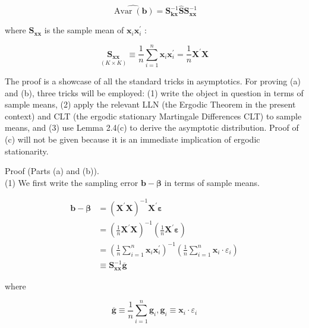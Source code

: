 \documentclass[10pt]{article}
\begin{document}
\begin{equation*}
\widehat{\operatorname{Avar}(\mathbf{b})}=\mathbf{S}_{\mathbf{k x}}^{-1} \widehat{\mathbf{S}} \mathbf{S}_{\mathbf{x x}}^{-1} \tag{2.3.5}
\end{equation*}


where $\mathbf{S}_{\mathbf{x x}}$ is the sample mean of $\mathbf{x}_{i} \mathbf{x}_{i}^{\prime}$ :


\begin{equation*}
\underset{(K \times K)}{\mathbf{S}_{\mathbf{x x}}} \equiv \frac{1}{n} \sum_{i=1}^{n} \mathbf{x}_{i} \mathbf{x}_{i}^{\prime}=\frac{1}{n} \mathbf{X}^{\prime} \mathbf{X} \tag{2.3.6}
\end{equation*}


The proof is a showcase of all the standard tricks in asymptotics. For proving (a) and (b), three tricks will be employed: (1) write the object in question in terms of sample means, (2) apply the relevant LLN (the Ergodic Theorem in the present context) and CLT (the ergodic stationary Martingale Differences CLT) to sample means, and (3) use Lemma 2.4(c) to derive the asymptotic distribution. Proof of (c) will not be given because it is an immediate implication of ergodic stationarity.

Proof (Parts (a) and (b)).\\
(1) We first write the sampling error $\mathbf{b}-\boldsymbol{\beta}$ in terms of sample means.


\begin{align*}
\mathbf{b}-\boldsymbol{\beta} & =\left(\mathbf{X}^{\prime} \mathbf{X}\right)^{-1} \mathbf{X}^{\prime} \boldsymbol{\varepsilon} \\
& =\left(\frac{1}{n} \mathbf{X}^{\prime} \mathbf{X}\right)^{-1}\left(\frac{1}{n} \mathbf{X}^{\prime} \boldsymbol{\varepsilon}\right) \\
& =\left(\frac{1}{n} \sum_{i=1}^{n} \mathbf{x}_{i} \mathbf{x}_{i}^{\prime}\right)^{-1}\left(\frac{1}{n} \sum_{i=1}^{n} \mathbf{x}_{i} \cdot \varepsilon_{i}\right) \\
& \equiv \mathbf{S}_{\mathbf{x x}}^{-1} \overline{\mathbf{g}} \tag{2.3.7}
\end{align*}


where

$$
\overline{\mathbf{g}} \equiv \frac{1}{n} \sum_{i=1}^{n} \mathbf{g}_{i}, \mathbf{g}_{i} \equiv \mathbf{x}_{i} \cdot \varepsilon_{i}
$$
\end{document}
